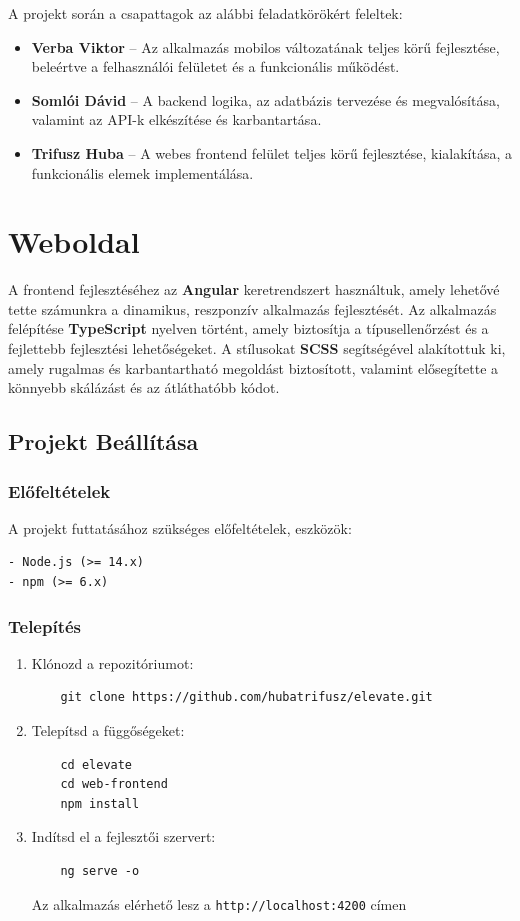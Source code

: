 \documentclass[12pt]{report}
\begin{document}
A projekt során a csapattagok az alábbi feladatkörökért feleltek:

\begin{itemize}
  \item \textbf{Verba Viktor} -- Az alkalmazás mobilos változatának teljes körű fejlesztése, beleértve a felhasználói felületet és a funkcionális működést.
  
  \item \textbf{Somlói Dávid} -- A backend logika, az adatbázis tervezése és megvalósítása, valamint az API-k elkészítése és karbantartása.
  
  \item \textbf{Trifusz Huba} -- A webes frontend felület teljes körű fejlesztése, kialakítása, a funkcionális elemek implementálása.
\end{itemize}
\chapter{Weboldal}
A frontend fejlesztéséhez az \textbf{Angular} keretrendszert használtuk, amely lehetővé tette számunkra a dinamikus, reszponzív alkalmazás fejlesztését. Az alkalmazás felépítése \textbf{TypeScript} nyelven történt, amely biztosítja a típusellenőrzést és a fejlettebb fejlesztési lehetőségeket. A stílusokat \textbf{SCSS} segítségével alakítottuk ki, amely rugalmas és karbantartható megoldást biztosított, valamint elősegítette a könnyebb skálázást és az átláthatóbb kódot.
\section{Projekt Beállítása}

\subsection{Előfeltételek}
A projekt futtatásához szükséges előfeltételek, eszközök:
\begin{verbatim}
- Node.js (>= 14.x)
- npm (>= 6.x)
\end{verbatim}

\subsection{Telepítés}
\begin{enumerate}
    \item Klónozd a repozitóriumot:
    \begin{verbatim}
    git clone https://github.com/hubatrifusz/elevate.git
    \end{verbatim}
    
    \item Telepítsd a függőségeket:
    \begin{verbatim}
    cd elevate
    cd web-frontend
    npm install
    \end{verbatim}
    
    \item Indítsd el a fejlesztői szervert:
    \begin{verbatim}
    ng serve -o
    \end{verbatim}
    Az alkalmazás elérhető lesz a \texttt{http://localhost:4200} címen
\end{enumerate}
\end{document}
